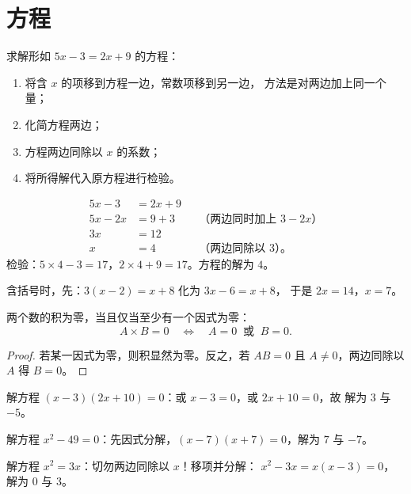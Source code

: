 \section{方程}

\begin{method}[一元一次方程]\label{met:g9:algebra:firstdegree}
求解形如 $5x - 3 = 2x + 9$ 的方程：
\begin{enumerate}
  \item 将含 $x$ 的项移到方程一边，常数项移到另一边，
        方法是对两边加上同一个量；
  \item 化简方程两边；
  \item 方程两边同除以 $x$ 的系数；
  \item 将所得解代入原方程进行检验。
\end{enumerate}
\end{method}

\begin{example}\label{ex:g9:algebra:firstdegree}
\begin{align*}
5x - 3 &= 2x + 9 \\
5x - 2x &= 9 + 3 && \text{（两边同时加上 $3 - 2x$）}\\
3x &= 12 \\
x &= 4 && \text{（两边同除以 3）。}
\end{align*}
检验：$5 \times 4 - 3 = 17$，$2 \times 4 + 9 = 17$。方程的解为
$4$。

含括号时，先：$3(x - 2) = x + 8$ 化为 $3x - 6 = x + 8$，
于是 $2x = 14$，$x = 7$。
\end{example}

\begin{theorem}[零因子法则]\label{thm:g9:algebra:zeroproduct}
两个数的积为零，当且仅当至少有一个因式为零：
\[
A \times B = 0
\quad\Longleftrightarrow\quad
A = 0 \ \text{ 或 } \ B = 0 .
\]
\end{theorem}

\begin{proof}
若某一因式为零，则积显然为零。反之，若 $A B = 0$ 且
$A \neq 0$，两边同除以 $A$ 得 $B = 0$。
\end{proof}

\begin{example}\label{ex:g9:algebra:zeroproduct}
解方程 $(x - 3)(2x + 10) = 0$：或 $x - 3 = 0$，或 $2x + 10 = 0$，故
解为 $3$ 与 $-5$。

解方程 $x^2 - 49 = 0$：先因式分解，$(x-7)(x+7) = 0$，解为 $7$ 与
$-7$。

解方程 $x^2 = 3x$：切勿两边同除以 $x$！移项并分解：
$x^2 - 3x = x(x - 3) = 0$，解为 $0$ 与 $3$。
\end{example}

